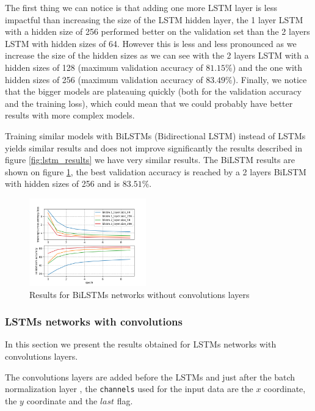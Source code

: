 \documentclass[10pt,twocolumn,letterpaper]{article}
\begin{document}
The first thing we can notice is that adding one more LSTM layer is less impactful than increasing the size of the LSTM hidden layer, the 1 layer LSTM with a hidden size of 256 performed better on the validation set than the 2 layers LSTM with hidden sizes of 64. However this is less and less pronounced as we increase the size of the hidden sizes as we can see with the 2 layers LSTM with a hidden sizes of 128 (maximum validation accuracy of $81.15\%$) and the one with hidden sizes of 256 (maximum validation accuracy of $83.49\%$). Finally, we notice that the bigger models are plateauing quickly (both for the validation accuracy and the training loss), which could mean that we could probably have better results with more complex models.

Training similar models with BiLSTMs (Bidirectional LSTM) instead of LSTMs yields similar results and does not improve significantly the results described in figure \ref{fig:lstm_results} we have very similar results. The BiLSTM results are shown on figure \ref{fig:bilstm_results}, the best validation accuracy is reached by a 2 layers BiLSTM with hidden sizes of 256 and is $83.51\%$.

\begin{figure}[h] 
\centering
\includegraphics[width=0.45\textwidth]{images/simple_bilstm_results.png}
\caption{Results for BiLSTMs networks without convolutions layers}
\label{fig:bilstm_results}
\end{figure}


\subsubsection{LSTMs networks with convolutions}

In this section we present the results obtained for LSTMs networks with convolutions layers.

The convolutions layers are added before the LSTMs and just after the batch normalization layer \cite{ioffe2015batch}, the \texttt{channels} used for the input data are the $x$ coordinate, the $y$ coordinate and the $last$ flag.
\end{document}
